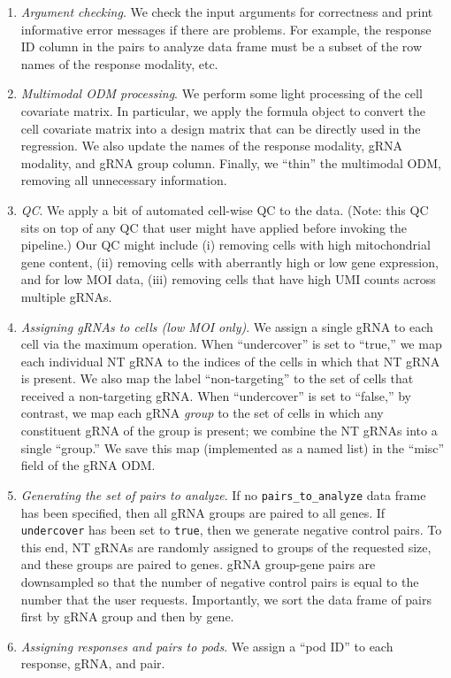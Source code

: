 \documentclass[12pt]{article}
\begin{document}
\begin{enumerate}
\item \textit{Argument checking}. We check the input arguments for correctness and print informative error messages if there are problems. For example, the  response ID column in the pairs to analyze data frame must be a subset of the row names of the response modality, etc.

\item \textit{Multimodal ODM processing}. We perform some light processing of the cell covariate matrix. In particular, we apply the formula object to convert the cell covariate matrix into a design matrix that can be directly used in the regression. We also update the names of the response modality, gRNA modality, and gRNA group column. Finally, we ``thin'' the multimodal ODM, removing all unnecessary information.

\item \textit{QC}. We apply a bit of automated cell-wise QC to the data. (Note: this QC sits on top of any QC that user might have applied before invoking the pipeline.) Our QC might include (i) removing cells with high mitochondrial gene content, (ii) removing cells with aberrantly high or low gene expression, and for low MOI data, (iii) removing cells that have high UMI counts across multiple gRNAs.

\item\textit{Assigning gRNAs to cells (low MOI only)}. We assign a single gRNA to each cell via the maximum operation. When ``undercover'' is set to ``true,'' we map each individual NT gRNA to the indices of the cells in which that NT gRNA is present. We also map the label ``non-targeting'' to the set of cells that received a non-targeting gRNA. When ``undercover'' is set to ``false,'' by contrast, we map each gRNA \textit{group} to the set of cells in which any constituent gRNA of the group is present; we combine the NT gRNAs into a single ``group.'' We save this map (implemented as a named list) in the ``misc'' field of the gRNA ODM.

\item \textit{Generating the set of pairs to analyze}. If no \texttt{pairs\_to\_analyze} data frame has been specified, then all gRNA groups are paired to all genes. If \texttt{undercover} has been set to \texttt{true}, then we generate negative control pairs. To this end, NT gRNAs are randomly assigned to groups of the requested size, and these groups are paired to genes. gRNA group-gene pairs are downsampled so that the number of negative control pairs is equal to the number that the user requests. Importantly, we sort the data frame of pairs first by gRNA group and then by gene.

\item \textit{Assigning responses and pairs to pods}. We assign a “pod ID” to each response, gRNA, and pair.

\end{enumerate}
\end{document}
